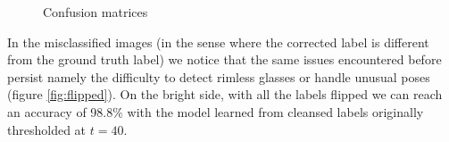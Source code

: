 \documentclass[a4paper]{article}
\begin{document}
            \begin{figure}[H]
            \centering
            \hspace{40pt}
            \begin{minipage}{.2\textwidth}
            \vspace{30pt}
			\end{minipage}
            \hspace{10pt}\begin{minipage}{.6\textwidth}
            \hspace{10pt}
            \end{minipage}
            \caption{Confusion matrices}
            \end{figure}
            In the misclassified images (in the sense where the corrected label is different from the ground truth label) we notice that the same issues encountered before persist namely the difficulty to detect rimless glasses or handle unusual poses (figure \ref{fig:flipped}). On the bright side, with all the labels flipped we can reach an accuracy of 98.8\% with the model learned from cleansed labels originally thresholded at $t=40$.
            
\end{document}
